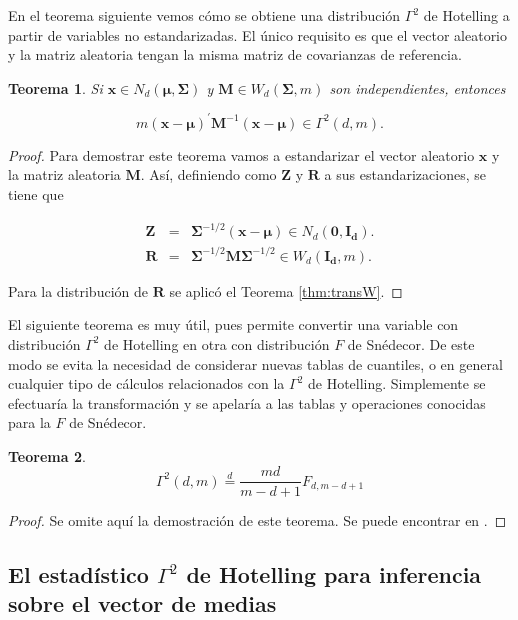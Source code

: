 \documentclass[
  a4paper,
  oneside]{scrbook}
\newtheorem{theorem}{Teorema}[chapter]
\theoremstyle{definition}
\theoremstyle{definition}
\theoremstyle{definition}
\theoremstyle{definition}
\theoremstyle{remark}
\begin{document}
En el teorema siguiente vemos cómo se obtiene una distribución
\(\Gamma^2\) de Hotelling a partir de variables no estandarizadas. El
único requisito es que el vector aleatorio y la matriz aleatoria tengan
la misma matriz de covarianzas de referencia.

\begin{theorem}
\protect\hypertarget{thm:unnamed-chunk-105}{}\label{thm:unnamed-chunk-105}Si \(\bm{x}\in N_d(\bm\mu,\bm\Sigma)\) y \(\bm{M}\in W_d(\bm\Sigma,m)\) son
independientes, entonces

\[m \left(\bm{x}-\bm\mu\right)^{\prime} \bm{M}^{-1} \left(\bm{x}-\bm\mu\right) \in \Gamma^2(d,m).\]
\end{theorem}

\begin{proof}
Para demostrar este teorema vamos a estandarizar el vector
aleatorio \(\bm{x}\) y la matriz aleatoria \(\bm{M}\). Así, definiendo como
\(\bm{Z}\) y \(\bm{R}\) a sus estandarizaciones, se tiene que

\[\begin{aligned}
\bm{Z}&=&\bm\Sigma^{-1/2}(\bm{x}-\bm\mu)\in N_d(\bm{0},\bm{I_d}). \\
\bm{R}&=&\bm\Sigma^{-1/2}\bm{M}\bm\Sigma^{-1/2} \in W_d(\bm{I_d},m).\end{aligned}\]

Para la distribución de \(\bm{R}\) se aplicó el Teorema \ref{thm:transW}.
\end{proof}

El siguiente teorema es muy útil, pues permite convertir una variable
con distribución \(\Gamma^2\) de Hotelling en otra con distribución \(F\) de
Snédecor. De este modo se evita la necesidad de considerar nuevas tablas
de cuantiles, o en general cualquier tipo de cálculos relacionados con
la \(\Gamma^2\) de Hotelling. Simplemente se efectuaría la transformación
y se apelaría a las tablas y operaciones conocidas para la \(F\) de
Snédecor.

\begin{theorem}
\protect\hypertarget{thm:gf}{}\label{thm:gf}\[\Gamma^2(d,m)\stackrel{d}{=} \frac{md}{m-d+1} F_{d,m-d+1}\]
\end{theorem}

\begin{proof}
Se omite aquí la demostración de este teorema. Se puede
encontrar en \citet{mkb79}.
\end{proof}

\subsection{\texorpdfstring{El estadístico \(\Gamma^2\) de Hotelling para inferencia sobre el vector de medias}{El estadístico \textbackslash Gamma\^{}2 de Hotelling para inferencia sobre el vector de medias}}\label{el-estadistico-gamma-2-de-hotelling-para-inferencia-sobre-el-vector-de-medias}
\end{document}
